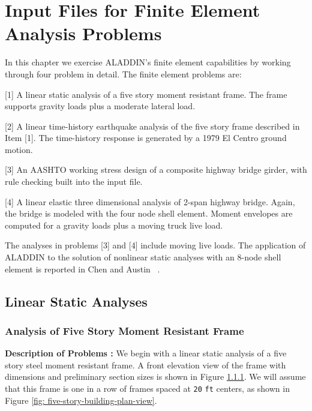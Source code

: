 \chapter{Input Files for Finite Element Analysis Problems}

\vspace{0.15 in}
\noindent\hspace{0.5 in}
In this chapter we exercise ALADDIN's finite element capabilities
by working through four problem in detail.
The finite element problems are:

\begin{description}
\item{[1]}
A linear static analysis of a five story moment resistant frame.
The frame supports gravity loads plus a moderate lateral load.
\item{[2]}
A linear time-history earthquake analysis of the five story frame described in Item [1].
The time-history response is generated by a 1979 El Centro ground motion.
\item{[3]}
An AASHTO working stress design of a composite highway bridge girder,
with rule checking built into the input file.
\item{[4]}
A linear elastic three dimensional analysis of 2-span highway bridge.
Again, the bridge is modeled with the four node shell element.
Moment envelopes are computed for a gravity loads plus a moving truck live load.
\end{description}

\vspace{0.15 in}\noindent
The analyses in problems [3] and [4] include moving live loads.
The application of ALADDIN to the solution of nonlinear static analyses 
with an 8-node shell element is reported in Chen and Austin ~\cite{chen95}.

\section{Linear Static Analyses}

\subsection{Analysis of Five Story Moment Resistant Frame}

\label{fig: five-story-building-elevation-view}

\vspace{0.15 in}\noindent
{\bf Description of Problems :}
We begin with a linear static analysis of a five story steel moment resistant frame.
A front elevation view of the frame with dimensions and preliminary
section sizes is shown in Figure \ref{fig: five-story-building-elevation-view}.
We will assume that this frame is one in a row of frames spaced at {\tt 20} {\tt ft} centers,
as shown in Figure \ref{fig: five-story-building-plan-view}.


